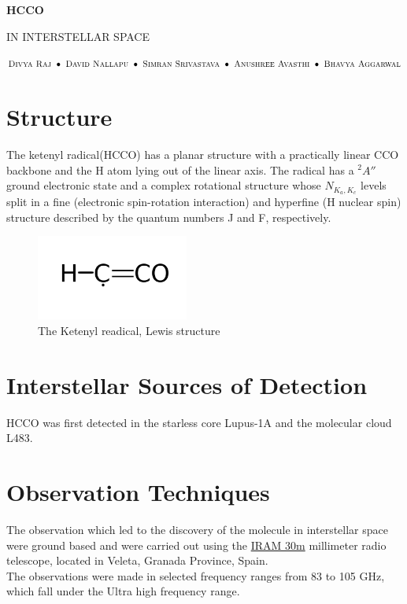 \documentclass[12 pt]{article}
\begin{document}
	
	\begin{center}
		
		\begin{Huge}
		\textbf{HCCO}
		\end{Huge}
			
		\begin{Large}
		\textsc{IN INTERSTELLAR SPACE\linebreak}
		\end{Large}
		
		\begin{scriptsize}
		$
		\textsc{Divya Raj }\bullet\textsc{ David Nallapu }\bullet\textsc{ Simran Srivastava }\bullet\textsc{ Anushree Avasthi }\bullet						\textsc{ Bhavya Aggarwal}	
		$
		\end{scriptsize}
				
	\end{center}
	
	\section*{Structure}
		The  ketenyl  radical(HCCO) has  a  planar  structure  with  a  practically  linear  CCO  backbone  and  the  H  atom  lying  out  of  			the	linear  axis.  The  radical  has a ${}^2A''$ ground  electronic  state  and a  complex  rotational  structure  whose $N_{K_a,K_c}$ 			levels  split in  a	fine (electronic spin-rotation interaction) and hyperfine (H nuclear  spin)  structure  described  by  the  quantum  		numbers J and F, respectively.
		
		\begin{figure}[h!]
		  \includegraphics[width=50mm]{hcco.png}
  			\centering
  			\caption{The Ketenyl readical, Lewis structure }
  			\label{fig:PublicKey-Basic}
		\end{figure}
		
	\section*{Interstellar Sources of Detection}
		HCCO was first detected in the starless core Lupus-1A and the molecular cloud L483.\cite{mcg}
		
	\section*{Observation Techniques}
		The observation which led to the discovery of the molecule in interstellar space were ground based and were carried out using the
		\href{https://en.wikipedia.org/wiki/IRAM_30m_telescope}{IRAM 30m}
		millimeter radio telescope, located in Veleta, Granada Province, Spain.\cite{IRAMwiki}
		\\The observations were made in selected frequency ranges from 83 to 105 GHz, which fall under the Ultra high frequency 
		range.\cite{EMwiki}
		
\end{document}
